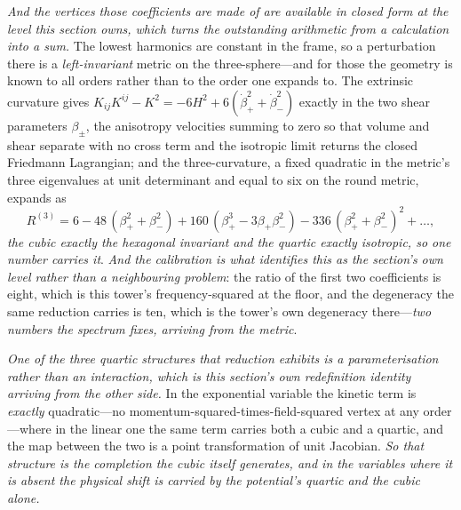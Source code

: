\documentclass[11pt,a4paper]{article}
\theoremstyle{plain}
\theoremstyle{definition}
\theoremstyle{remark}
\begin{document}
\emph{And the vertices those coefficients are made of are available in closed form at the level this section
owns, which turns the outstanding arithmetic from a calculation into a sum.} The lowest harmonics are constant
in the frame, so a perturbation there is a \emph{left-invariant} metric on the three-sphere---and for those
the geometry is known to all orders rather than to the order one expands to. The extrinsic curvature gives
$K_{ij}K^{ij}-K^{2}=-6H^{2}+6(\dot\beta_{+}^{2}+\dot\beta_{-}^{2})$ exactly in the two shear parameters
$\beta_{\pm}$, the anisotropy velocities summing to zero so that volume and shear separate with no cross term
and the isotropic limit returns the closed Friedmann Lagrangian; and the three-curvature, a fixed quadratic in
the metric's three eigenvalues at unit determinant and equal to six on the round metric, expands as
\begin{equation}
R^{(3)}=6-48\,(\beta_{+}^{2}+\beta_{-}^{2})+160\,(\beta_{+}^{3}-3\beta_{+}\beta_{-}^{2})
-336\,(\beta_{+}^{2}+\beta_{-}^{2})^{2}+\dots,
\label{eq:s3-left-invariant-curvature}
\end{equation}
\emph{the cubic exactly the hexagonal invariant and the quartic exactly isotropic, so one number carries it}.
\emph{And the calibration is what identifies this as the section's own level rather than a neighbouring
problem}: the ratio of the first two coefficients is eight, which is this tower's frequency-squared at the
floor, and the degeneracy the same reduction carries is ten, which is the tower's own degeneracy
there---\emph{two numbers the spectrum fixes, arriving from the metric}.

\emph{One of the three quartic structures that reduction exhibits is a parameterisation rather than an
interaction, which is this section's own redefinition identity arriving from the other side.} In the
exponential variable the kinetic term is \emph{exactly} quadratic---no momentum-squared-times-field-squared
vertex at any order---where in the linear one the same term carries both a cubic and a quartic, and the map
between the two is a point transformation of unit Jacobian. \emph{So that structure is the completion the
cubic itself generates, and in the variables where it is absent the physical shift is carried by the
potential's quartic and the cubic alone.}
\end{document}
